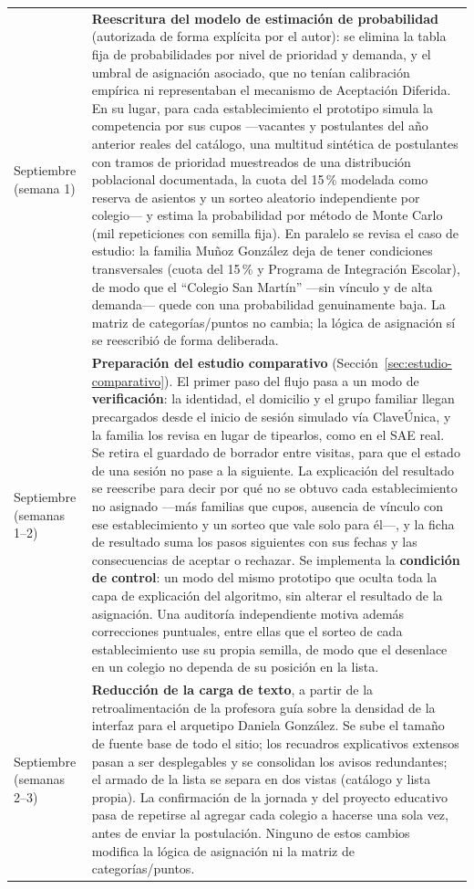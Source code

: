 {\begin{longtable}{p{2.2cm}p{9.5cm}}
Septiembre (semana 1) & \textbf{Reescritura del modelo de estimación de probabilidad} (autorizada de forma explícita por el autor): se elimina la tabla fija de probabilidades por nivel de prioridad y demanda, y el umbral de asignación asociado, que no tenían calibración empírica ni representaban el mecanismo de Aceptación Diferida. En su lugar, para cada establecimiento el prototipo simula la competencia por sus cupos —vacantes y postulantes del año anterior reales del catálogo, una multitud sintética de postulantes con tramos de prioridad muestreados de una distribución poblacional documentada, la cuota del 15\,\% modelada como reserva de asientos y un sorteo aleatorio independiente por colegio— y estima la probabilidad por método de Monte Carlo (mil repeticiones con semilla fija). En paralelo se revisa el caso de estudio: la familia Muñoz González deja de tener condiciones transversales (cuota del 15\,\% y Programa de Integración Escolar), de modo que el ``Colegio San Martín'' —sin vínculo y de alta demanda— quede con una probabilidad genuinamente baja. La matriz de categorías/puntos no cambia; la lógica de asignación sí se reescribió de forma deliberada. \\
Septiembre (semanas 1--2) & \textbf{Preparación del estudio comparativo} (Sección~\ref{sec:estudio-comparativo}). El primer paso del flujo pasa a un modo de \textbf{verificación}: la identidad, el domicilio y el grupo familiar llegan precargados desde el inicio de sesión simulado vía ClaveÚnica, y la familia los revisa en lugar de tipearlos, como en el SAE real. Se retira el guardado de borrador entre visitas, para que el estado de una sesión no pase a la siguiente. La explicación del resultado se reescribe para decir por qué no se obtuvo cada establecimiento no asignado ---más familias que cupos, ausencia de vínculo con ese establecimiento y un sorteo que vale solo para él---, y la ficha de resultado suma los pasos siguientes con sus fechas y las consecuencias de aceptar o rechazar. Se implementa la \textbf{condición de control}: un modo del mismo prototipo que oculta toda la capa de explicación del algoritmo, sin alterar el resultado de la asignación. Una auditoría independiente motiva además correcciones puntuales, entre ellas que el sorteo de cada establecimiento use su propia semilla, de modo que el desenlace en un colegio no dependa de su posición en la lista. \\
Septiembre (semanas 2--3) & \textbf{Reducción de la carga de texto}, a partir de la retroalimentación de la profesora guía sobre la densidad de la interfaz para el arquetipo Daniela González. Se sube el tamaño de fuente base de todo el sitio; los recuadros explicativos extensos pasan a ser desplegables y se consolidan los avisos redundantes; el armado de la lista se separa en dos vistas (catálogo y lista propia). La confirmación de la jornada y del proyecto educativo pasa de repetirse al agregar cada colegio a hacerse una sola vez, antes de enviar la postulación. Ninguno de estos cambios modifica la lógica de asignación ni la matriz de categorías/puntos. \\

\end{longtable}}
